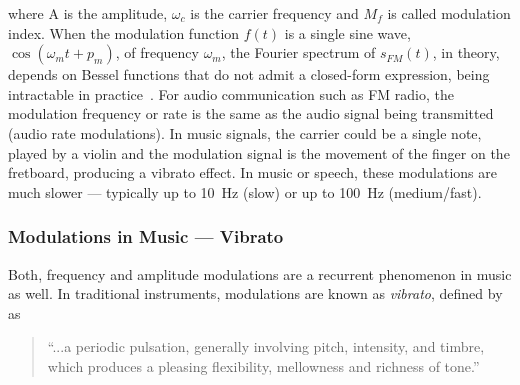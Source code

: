 where A is the amplitude, $\omega_{c}$ is the carrier frequency and $M_f$ is called modulation index.
When the modulation function $f(t)$ is a single sine wave, $\cos \left(\omega_{m} t+p_{m}\right)$, of frequency $\omega_{m}$, the Fourier spectrum of $s_{FM}(t)$, in theory, depends on Bessel functions that do not admit a closed-form expression, being intractable in practice~\cite{abramowitz64}.
For audio communication such as FM radio, the modulation frequency or rate is the same as the audio signal being transmitted (audio rate modulations).
In music signals, the carrier could be a single note, played by a violin and the modulation signal is the movement of the finger on the fretboard, producing a vibrato effect.
In music or speech, these modulations are much slower --- typically up to 10~\si{\hertz} (slow) or up to 100~\si{\hertz} (medium/fast).

\subsubsection*{Modulations in Music --- Vibrato}

Both, frequency and amplitude modulations are a recurrent phenomenon in music as well.
In traditional instruments, modulations are known as \emph{vibrato}, defined by~\cite{seashore31} as

\begin{quote}
``...a periodic pulsation, generally involving pitch, intensity, and timbre, which produces a pleasing flexibility, mellowness and richness of tone.''
\end{quote}

